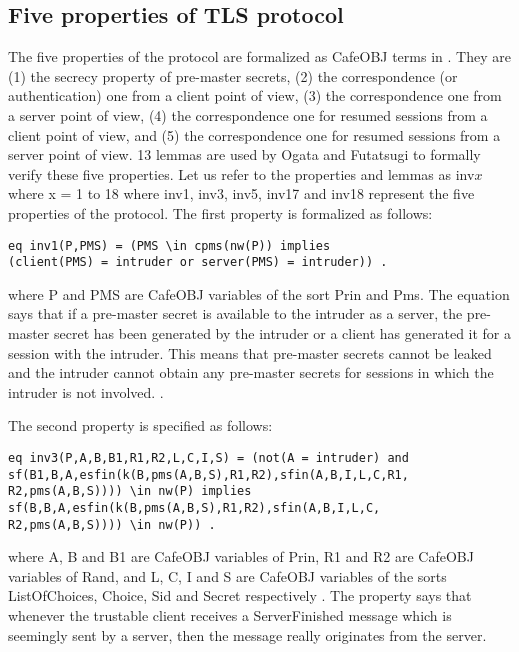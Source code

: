 \documentclass[a4paper,fleqn]{cas-dc}
\begin{document}
\subsection{Five properties of TLS protocol}
The five properties of the protocol are formalized as CafeOBJ terms in \cite{1437139}. They are (1) the secrecy property of pre-master secrets, (2) the correspondence (or authentication) one from a client point of view, (3) the correspondence one from a server point of view, (4) the correspondence one for resumed sessions from a client point of view, and (5) the correspondence one for resumed sessions from a server point of view. 13 lemmas are used by Ogata and Futatsugi to formally verify these five properties. 
Let us refer to the properties and lemmas as inv\textbf{$x$} where x = 1 to 18 where inv1, inv3, inv5, inv17 and inv18 represent the five properties of the protocol. The first property is formalized as follows: 
\begin{verbatim}
eq inv1(P,PMS) = (PMS \in cpms(nw(P)) implies 
(client(PMS) = intruder or server(PMS) = intruder)) .
\end{verbatim}
where P and PMS are CafeOBJ variables of the sort Prin and Pms. The equation says that if a pre-master secret is available to the intruder as a server, the pre-master secret has been generated by the intruder or a client has generated it for a session with the intruder. This means that pre-master secrets cannot be leaked and the intruder cannot obtain any pre-master secrets for sessions in which the intruder is not involved. .

The second property is specified as follows:
\begin{verbatim}
eq inv3(P,A,B,B1,R1,R2,L,C,I,S) = (not(A = intruder) and 
sf(B1,B,A,esfin(k(B,pms(A,B,S),R1,R2),sfin(A,B,I,L,C,R1,
R2,pms(A,B,S)))) \in nw(P) implies
sf(B,B,A,esfin(k(B,pms(A,B,S),R1,R2),sfin(A,B,I,L,C,
R2,pms(A,B,S)))) \in nw(P)) .
\end{verbatim}
where A, B and B1 are CafeOBJ variables of Prin, R1 and R2 are CafeOBJ variables of Rand, and L, C, I and S are CafeOBJ variables of the sorts ListOfChoices, Choice, Sid and Secret respectively . The property says that whenever the trustable client receives a ServerFinished message which is seemingly sent by a server, then the message really originates from the server. 
\end{document}
